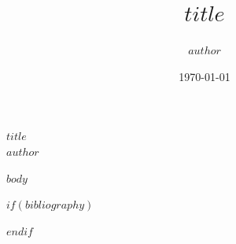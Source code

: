 \documentclass[a5paper,pagesize,10pt,bibliography=totoc,numbers=noenddot,DIV=9,twoside=true]{scrbook}
\title{$title$}
\author{$author$}
\begin{document}
\begin{titlepage}
\centering
\Huge{$title$}\\
\vspace{10mm}
\Large{$author$}\\
\vspace{\fill}
\centering \large{\date{\today}}
\end{titlepage}

\newpage

\tableofcontents

\newpage
{}

$body$


$if(bibliography)$

$endif$
\end{document}
